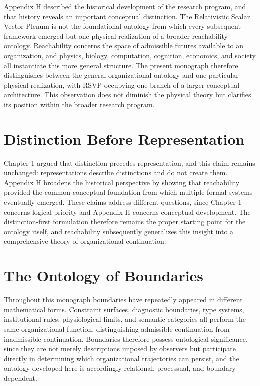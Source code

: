 \documentclass[11pt,oneside]{book}
\numberwithin{equation}{chapter}
\theoremstyle{definition}
\theoremstyle{plain}
\begin{document}
Appendix H described the historical development of the research program, and that history reveals an important conceptual distinction. The Relativistic Scalar Vector Plenum is not the foundational ontology from which every subsequent framework emerged but one physical realization of a broader reachability ontology. Reachability concerns the space of admissible futures available to an organization, and physics, biology, computation, cognition, economics, and society all instantiate this more general structure. The present monograph therefore distinguishes between the general organizational ontology and one particular physical realization, with RSVP occupying one branch of a larger conceptual architecture. This observation does not diminish the physical theory but clarifies its position within the broader research program.

\section{Distinction Before Representation}

Chapter 1 argued that distinction precedes representation, and this claim remains unchanged: representations describe distinctions and do not create them. Appendix H broadens the historical perspective by showing that reachability provided the common conceptual foundation from which multiple formal systems eventually emerged. These claims address different questions, since Chapter 1 concerns logical priority and Appendix H concerns conceptual development. The distinction-first formulation therefore remains the proper starting point for the ontology itself, and reachability subsequently generalizes this insight into a comprehensive theory of organizational continuation.

\section{The Ontology of Boundaries}

Throughout this monograph boundaries have repeatedly appeared in different mathematical forms. Constraint surfaces, diagnostic boundaries, type systems, institutional rules, physiological limits, and semantic categories all perform the same organizational function, distinguishing admissible continuation from inadmissible continuation. Boundaries therefore possess ontological significance, since they are not merely descriptions imposed by observers but participate directly in determining which organizational trajectories can persist, and the ontology developed here is accordingly relational, processual, and boundary-dependent.
\end{document}
